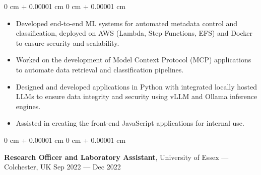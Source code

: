\documentclass[10pt, letterpaper]{article}
\newenvironment{highlights}{
    \begin{itemize}[
        topsep=0.10 cm,
        parsep=0.10 cm,
        partopsep=0pt,
        itemsep=0pt,
        leftmargin=0 cm + 10pt
    ]
}{
    \end{itemize}
} %
\newenvironment{onecolentry}{
    \begin{adjustwidth}{
        0 cm + 0.00001 cm
    }{
        0 cm + 0.00001 cm
    }
}{
    \end{adjustwidth}
} %
\newenvironment{twocolentry}[2][]{
    \onecolentry
    \def\secondColumn{#2}
    \setcolumnwidth{\fill, 4.5 cm}
    \begin{paracol}{2}
}{
    \switchcolumn \raggedleft \secondColumn
    \end{paracol}
    \endonecolentry
} %
\begin{document}
        \vspace{0.10 cm}
        \begin{onecolentry}
            \begin{highlights}
            \item Developed end-to-end ML systems for automated metadata control and classification, deployed on AWS (Lambda, Step Functions, EFS) and Docker to ensure security and scalability.
              \item Worked on the development of Model Context Protocol (MCP) applications to automate data retrieval and classification pipelines.
              \item Designed and developed applications in Python with integrated locally hosted LLMs to ensure data integrity and security using vLLM and Ollama inference engines.
              \item Assisted in creating the front-end JavaScript applications for internal use.
            \end{highlights}
        \end{onecolentry}


        \vspace{0.2 cm}

        \begin{twocolentry}{
            Sep 2022 --- Dec 2022
        }
            \textbf{Research Officer and Laboratory Assistant}, University of Essex --- Colchester, UK\end{twocolentry}
\end{document}
